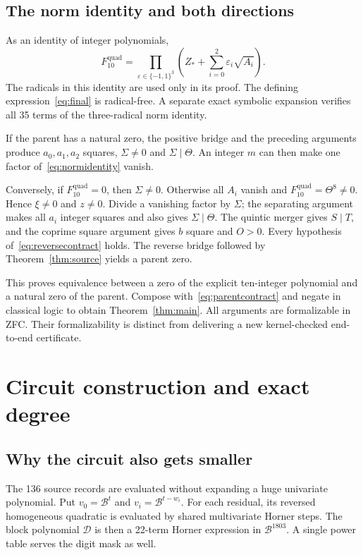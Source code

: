 \documentclass[11pt,letterpaper]{article}
\theoremstyle{definition}\newtheorem{definition}[theorem]{Definition}
\theoremstyle{remark}\newtheorem{remark}[theorem]{Remark}
\newcommand{\cB}{\mathcal B}
\newcommand{\cD}{\mathcal D}
\begin{document}
\subsection{The norm identity and both directions}

As an identity of integer polynomials,
\begin{equation}\label{eq:normidentity}
 F_{10}^{\mathrm{quad}}=
 \prod_{\varepsilon\in\{-1,1\}^3}
 \left(Z_*+\sum_{i=0}^2\varepsilon_i\sqrt{A_i}\right).
\end{equation}
The radicals in this identity are used only in its proof. The defining expression~\eqref{eq:final} is radical-free. A separate exact symbolic expansion verifies all 35 terms of the three-radical norm identity.

If the parent has a natural zero, the positive bridge and the preceding arguments produce $a_0,a_1,a_2$ squares, $\Sigma\ne0$ and $\Sigma\mid\Theta$. An integer $m$ can then make one factor of~\eqref{eq:normidentity} vanish.

Conversely, if $F_{10}^{\mathrm{quad}}=0$, then $\Sigma\ne0$. Otherwise all $A_i$ vanish and $F_{10}^{\mathrm{quad}}=\Theta^8\ne0$. Hence $\xi\ne0$ and $z\ne0$. Divide a vanishing factor by $\Sigma$; the separating argument makes all $a_i$ integer squares and also gives $\Sigma\mid\Theta$. The quintic merger gives $S\mid T$, and the coprime square argument gives $b$ square and $O>0$. Every hypothesis of~\eqref{eq:reversecontract} holds. The reverse bridge followed by Theorem~\ref{thm:source} yields a parent zero.

This proves equivalence between a zero of the explicit ten-integer polynomial and a natural zero of the parent. Compose with~\eqref{eq:parentcontract} and negate in classical logic to obtain Theorem~\ref{thm:main}. All arguments are formalizable in ZFC. Their formalizability is distinct from delivering a new kernel-checked end-to-end certificate.

\section{Circuit construction and exact degree}\label{sec:metrics}

\subsection{Why the circuit also gets smaller}

The 136 source records are evaluated without expanding a huge univariate polynomial. Put $v_0=\cB^t$ and $v_i=\cB^{t-w_i}$. For each residual, its reversed homogeneous quadratic is evaluated by shared multivariate Horner steps. The block polynomial $\cD$ is then a 22-term Horner expression in $\cB^{1803}$. A single power table serves the digit mask as well.
\end{document}
